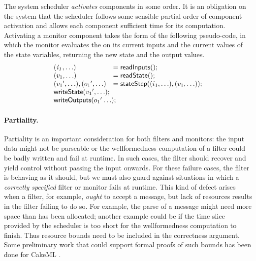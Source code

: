 The system scheduler \emph{activates} components in some order. It is
an obligation on the system that the scheduler follows some sensible
partial order of component activation and allows each component
sufficient time for its computation.  Activating a monitor component
takes the form of the following pseudo-code, in which the monitor
evaluates the  on its current inputs and the current
values of the state variables, returning the new state and the output
values.
\[
\begin{array}{ll}
 \mathit{(i_1,\ldots)} & = \konst{readInputs}(); \\
 (v_1,\ldots) & = \konst{readState}() ; \\
 ({v_1}',\ldots), ({o_1}',\ldots) & = \konst{stateStep} ((i_1,\ldots),(v_1,\ldots)) ; \\
 \multicolumn{2}{l}{\konst{writeState}({v_1}',\ldots);} \\
 \multicolumn{2}{l}{\konst{writeOutputs}({o_1}'\ldots);} \\
\end{array}
\]

\paragraph{Partiality.} Partiality is an important consideration for both filters and
monitors: the input data might not be parseable or the wellformedness
computation of a filter could be badly written and fail at runtime. In
such cases, the filter should recover and yield control without
passing the input onwards. For these failure cases, the filter is
behaving as it should, but we must also guard against situations in
which a \emph{correctly specified} filter or monitor fails at
runtime. This kind of defect arises when a filter, for
example, \emph{ought} to accept a message, but lack of resources
results in the filter failing to do so. For example, the parse of a
message might need more space than has been allocated; another example
could be if the time slice provided by the scheduler is too short for
the wellformedness computation to finish. Thus resource bounds need to
be included in the correctness argument. Some preliminary work that
could support formal proofs of such bounds has been done for
CakeML \cite{cakeml-space-cost}.


